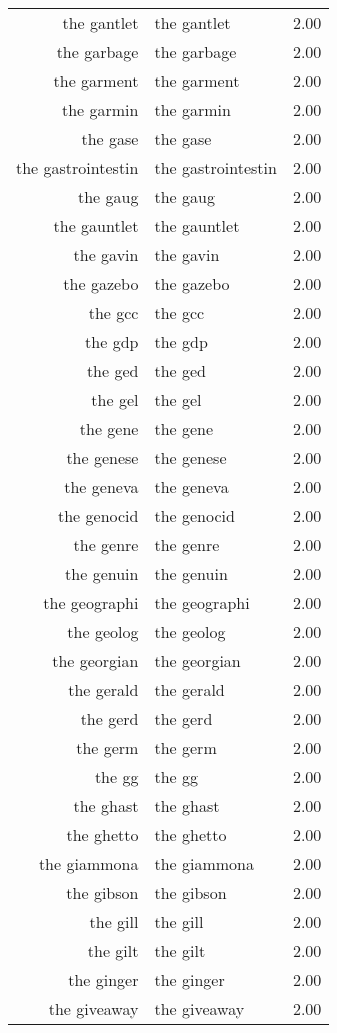 \begin{table}[ht]
\begin{tabular}{rlr}
  the gantlet & the gantlet & 2.00 \\ 
  the garbage & the garbage & 2.00 \\ 
  the garment & the garment & 2.00 \\ 
  the garmin & the garmin & 2.00 \\ 
  the gase & the gase & 2.00 \\ 
  the gastrointestin & the gastrointestin & 2.00 \\ 
  the gaug & the gaug & 2.00 \\ 
  the gauntlet & the gauntlet & 2.00 \\ 
  the gavin & the gavin & 2.00 \\ 
  the gazebo & the gazebo & 2.00 \\ 
  the gcc & the gcc & 2.00 \\ 
  the gdp & the gdp & 2.00 \\ 
  the ged & the ged & 2.00 \\ 
  the gel & the gel & 2.00 \\ 
  the gene & the gene & 2.00 \\ 
  the genese & the genese & 2.00 \\ 
  the geneva & the geneva & 2.00 \\ 
  the genocid & the genocid & 2.00 \\ 
  the genre & the genre & 2.00 \\ 
  the genuin & the genuin & 2.00 \\ 
  the geographi & the geographi & 2.00 \\ 
  the geolog & the geolog & 2.00 \\ 
  the georgian & the georgian & 2.00 \\ 
  the gerald & the gerald & 2.00 \\ 
  the gerd & the gerd & 2.00 \\ 
  the germ & the germ & 2.00 \\ 
  the gg & the gg & 2.00 \\ 
  the ghast & the ghast & 2.00 \\ 
  the ghetto & the ghetto & 2.00 \\ 
  the giammona & the giammona & 2.00 \\ 
  the gibson & the gibson & 2.00 \\ 
  the gill & the gill & 2.00 \\ 
  the gilt & the gilt & 2.00 \\ 
  the ginger & the ginger & 2.00 \\ 
  the giveaway & the giveaway & 2.00 \\ 

\end{tabular}
\end{table}
